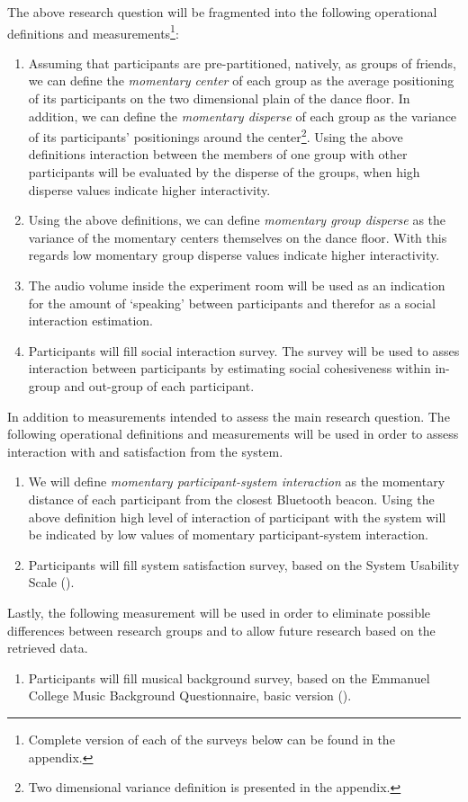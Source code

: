 \documentclass[a4paper,11pt]{article}
\newcommand{\definition}[1]{\emph{#1}}
\begin{document}
The above research question will be fragmented into the following operational definitions and measurements\footnote{Complete version of each of the surveys below can be found in the appendix.}:
\begin{enumerate}
	\item \label{measure:disperse} Assuming that participants are pre-partitioned, natively, as groups of friends, we can define the \definition{momentary center} of each group as the average positioning of its participants on the two dimensional plain of the dance floor.
	In addition, we can define the \definition{momentary disperse} of each group as the variance of its participants' positionings around the center\footnote{Two dimensional variance definition is presented in the appendix.}.
	Using the above definitions interaction between the members of one group with other participants will be evaluated by the disperse of the groups, when high disperse values indicate higher interactivity.
	\item \label{measure:groups} Using the above definitions, we can define \definition{momentary group disperse} as the variance of the momentary centers themselves on the dance floor.
	With this regards low momentary group disperse values indicate higher interactivity.
	\item \label{measure:audio} The audio volume inside the experiment room will be used as an indication for the amount of `speaking' between participants and therefor as a social interaction estimation.
	\item \label{measure:survey:social} Participants will fill social interaction survey.
	The survey will be used to asses interaction between participants by estimating social cohesiveness within in-group and out-group of each participant.
\end{enumerate}
In addition to measurements intended to assess the main research question.
The following operational definitions and measurements will be used in order to assess interaction with and satisfaction from the system.
\begin{enumerate}[resume]
	\item \label{measure:system} We will define \definition{momentary participant-system interaction} as the momentary distance of each participant from the closest Bluetooth beacon.
	Using the above definition high level of interaction of participant with the system will be indicated by low values of momentary participant-system interaction.
	\item \label{measure:survey:usability} Participants will fill system satisfaction survey, based on the System Usability Scale (\cite{brooke96}).
\end{enumerate}
Lastly, the following measurement will be used in order to eliminate possible differences between research groups and to allow future research based on the retrieved data.
\begin{enumerate}[resume]
	\item \label{measure:survey:musical} Participants will fill musical background survey, based on the Emmanuel College Music Background Questionnaire, basic version (\cite{web:zhao12}).
\end{enumerate}
\end{document}
